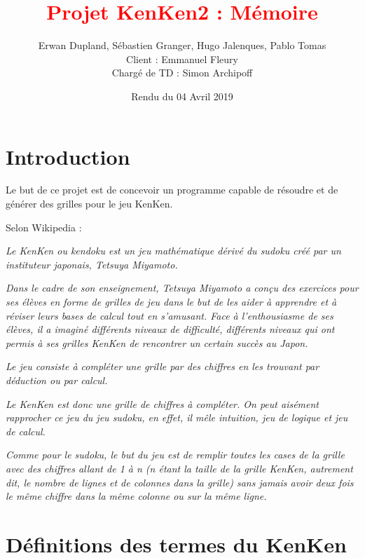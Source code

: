 \documentclass[1]{report}
\title{\textcolor{red}{Projet KenKen2 : Mémoire}}
\author{Erwan Dupland, Sébastien Granger, Hugo Jalenques, Pablo Tomas
\\ Client : Emmanuel Fleury \\ Chargé de TD : Simon Archipoff}
\date{Rendu du 04 Avril 2019}
\begin{document}
  
\chapterfont{\color{black}}

\maketitle

\renewcommand{\contentsname}{Sommaire} 
\tableofcontents

\chapter{Introduction}


		Le but de ce projet est de concevoir un programme capable de résoudre et de générer des grilles pour le jeu KenKen. \newline
		
		Selon Wikipedia : \newline
		
        \textit{Le KenKen ou kendoku est un jeu mathématique dérivé du sudoku créé par un instituteur japonais, Tetsuya Miyamoto.}
        
        \textit{
        Dans le cadre de son enseignement, Tetsuya Miyamoto a conçu des exercices pour ses élèves en forme de grilles de jeu dans le but de les aider à apprendre et à réviser leurs bases de calcul tout en s'amusant.
        Face à l'enthousiasme de ses élèves, il a imaginé différents niveaux de difficulté, différents niveaux qui ont permis à ses grilles KenKen de rencontrer un certain succès au Japon.}
        
        \textit{
        Le jeu consiste à compléter une grille par des chiffres en les trouvant par déduction ou par calcul.}
        
        \textit{
        Le KenKen est donc une grille de chiffres à compléter. On peut aisément rapprocher ce jeu du jeu sudoku, en effet, il mêle intuition, jeu de logique et jeu de calcul.}
        
        \textit{
        Comme pour le sudoku, le but du jeu est de remplir toutes les cases de la grille avec des chiffres allant de 1 à n (n étant la taille de la grille KenKen, autrement dit, le nombre de lignes et de colonnes dans la grille) sans jamais avoir deux fois le même chiffre dans la même colonne ou sur la même ligne.}
      

\chapter{Définitions des termes du KenKen}
\end{document}
